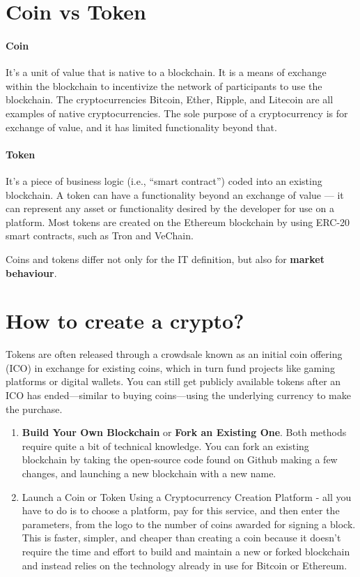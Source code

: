 
\section{Coin vs Token}

\paragraph{Coin} It's a unit of value that is native to a blockchain. It is a means of exchange within the blockchain to incentivize the network of participants to use the blockchain. The cryptocurrencies Bitcoin, Ether, Ripple, and Litecoin are all examples of native cryptocurrencies. The sole purpose of a cryptocurrency is for exchange of value, and it has limited functionality beyond that.

\paragraph{Token} It's a piece of business logic (i.e., ``smart contract'') coded into an existing blockchain. A token can have a functionality beyond an exchange of value — it can represent any asset or functionality desired by the developer for use on a platform. Most tokens are created on the Ethereum blockchain by using ERC-20 smart contracts, such as Tron and VeChain.

Coins and tokens differ not only for the IT definition, but also for \textbf{market behaviour}.

\section{How to create a crypto?}

Tokens are often released through a crowdsale known as an initial coin offering (ICO) in exchange for existing coins, which in turn fund projects like gaming platforms or digital wallets. You can still get publicly available tokens after an ICO has ended—similar to buying coins—using the underlying currency to make the purchase.

\begin{enumerate}
	\item \textbf{Build Your Own Blockchain} or \textbf{Fork an Existing One}. Both methods require quite a bit of technical knowledge. You can fork an existing blockchain by taking the open-source code found on Github making a few changes, and launching a new blockchain with a new name.
	\item Launch a Coin or Token Using a Cryptocurrency Creation Platform - all you have to do is to choose a platform, pay for this service, and then enter the parameters, from the logo to the number of coins awarded for signing a block.
	This is faster, simpler, and cheaper than creating a coin because it doesn't require the time and effort to build and maintain a new or forked blockchain and instead relies on the technology already in use for Bitcoin or Ethereum.
\end{enumerate}

